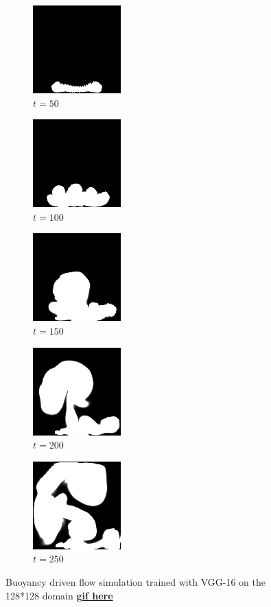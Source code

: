 \documentclass[a4paper,12pt,twoside]{report}
\begin{document}
\begin{figure}
	\centering
	\begin{subfigure}{0.18\textwidth}
		\centering
		\includegraphics[scale=0.56]{buoyancy_test/dens_000050_vgg.png}
		\caption{$t=50$}
	\end{subfigure}
	\begin{subfigure}{0.18\textwidth}
		\centering
		\includegraphics[scale=0.56]{buoyancy_test/dens_000100_vgg.png}
		\caption{$t=100$}
	\end{subfigure}
	\begin{subfigure}{0.18\textwidth}
		\centering
		\includegraphics[scale=0.56]{buoyancy_test/dens_000150_vgg.png}
		\caption{$t=150$}
	\end{subfigure}
	\begin{subfigure}{0.18\textwidth}
		\centering
		\includegraphics[scale=0.56]{buoyancy_test/dens_000200_vgg.png}
		\caption{$t=200$}
	\end{subfigure}
	\begin{subfigure}{0.18\textwidth}
		\centering
		\includegraphics[scale=0.56]{buoyancy_test/dens_000249_vgg.png}
		\caption{$t=250$}
	\end{subfigure}
	\caption{Buoyancy driven flow simulation trained with VGG-16 on the 128*128 domain \href{https://github.com/w191444052/sol-data/blob/master/buoyancy_high/vgg.gif}{\bf{gif here}}}
	\label{sol buoyancy high vgg}
\end{figure}
\end{document}
